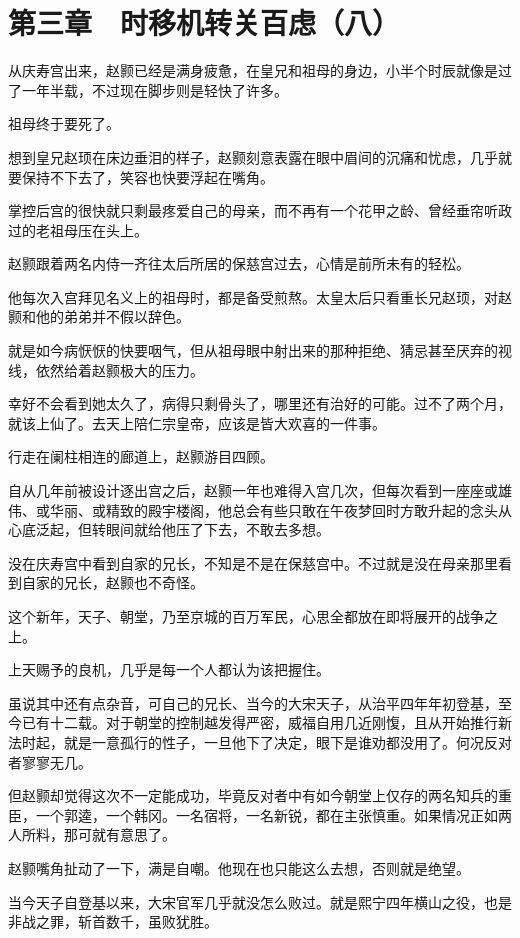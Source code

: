 \section{第三章　时移机转关百虑（八）}

从庆寿宫出来，赵颢已经是满身疲惫，在皇兄和祖母的身边，小半个时辰就像是过了一年半载，不过现在脚步则是轻快了许多。

祖母终于要死了。

想到皇兄赵顼在床边垂泪的样子，赵颢刻意表露在眼中眉间的沉痛和忧虑，几乎就要保持不下去了，笑容也快要浮起在嘴角。

掌控后宫的很快就只剩最疼爱自己的母亲，而不再有一个花甲之龄、曾经垂帘听政过的老祖母压在头上。

赵颢跟着两名内侍一齐往太后所居的保慈宫过去，心情是前所未有的轻松。

他每次入宫拜见名义上的祖母时，都是备受煎熬。太皇太后只看重长兄赵顼，对赵颢和他的弟弟并不假以辞色。

就是如今病恹恹的快要咽气，但从祖母眼中射出来的那种拒绝、猜忌甚至厌弃的视线，依然给着赵颢极大的压力。

幸好不会看到她太久了，病得只剩骨头了，哪里还有治好的可能。过不了两个月，就该上仙了。去天上陪仁宗皇帝，应该是皆大欢喜的一件事。

行走在阑柱相连的廊道上，赵颢游目四顾。

自从几年前被设计逐出宫之后，赵颢一年也难得入宫几次，但每次看到一座座或雄伟、或华丽、或精致的殿宇楼阁，他总会有些只敢在午夜梦回时方敢升起的念头从心底泛起，但转眼间就给他压了下去，不敢去多想。

没在庆寿宫中看到自家的兄长，不知是不是在保慈宫中。不过就是没在母亲那里看到自家的兄长，赵颢也不奇怪。

这个新年，天子、朝堂，乃至京城的百万军民，心思全都放在即将展开的战争之上。

上天赐予的良机，几乎是每一个人都认为该把握住。

虽说其中还有点杂音，可自己的兄长、当今的大宋天子，从治平四年年初登基，至今已有十二载。对于朝堂的控制越发得严密，威福自用几近刚愎，且从开始推行新法时起，就是一意孤行的性子，一旦他下了决定，眼下是谁劝都没用了。何况反对者寥寥无几。

但赵颢却觉得这次不一定能成功，毕竟反对者中有如今朝堂上仅存的两名知兵的重臣，一个郭逵，一个韩冈。一名宿将，一名新锐，都在主张慎重。如果情况正如两人所料，那可就有意思了。

赵颢嘴角扯动了一下，满是自嘲。他现在也只能这么去想，否则就是绝望。

当今天子自登基以来，大宋官军几乎就没怎么败过。就是熙宁四年横山之役，也是非战之罪，斩首数千，虽败犹胜。

